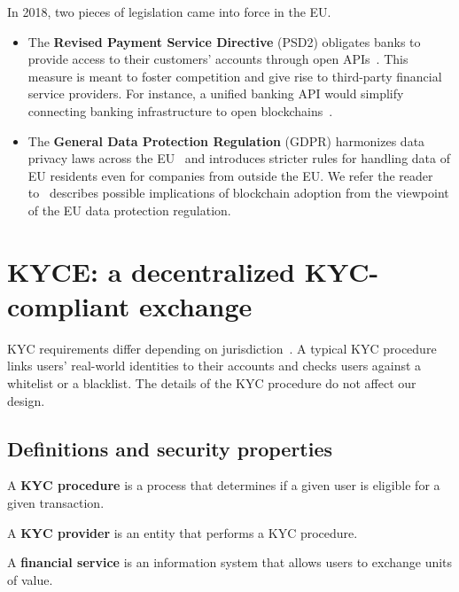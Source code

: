 In 2018, two pieces of legislation came into force in the EU\@.

\begin{itemize}
	\item The \textbf{Revised Payment Service Directive} (PSD2) obligates banks to provide access to their customers' accounts through open APIs~\cite{Hellstroem2017}.
	This measure is meant to foster competition and give rise to third-party financial service providers.
	For instance, a unified banking API would simplify connecting banking infrastructure to open blockchains~\cite{Elison2016}.
	\item The \textbf{General Data Protection Regulation} (GDPR) harmonizes data privacy laws across the EU~\cite{GDPR16} and introduces stricter rules for handling data of EU residents even for companies from outside the EU\@. We refer the reader to~\cite{Berberich2016} describes possible implications of blockchain adoption from the viewpoint of the EU data protection regulation.
\end{itemize}


\section{KYCE: a decentralized KYC-compliant exchange}

KYC requirements differ depending on jurisdiction~\cite{PWC2015}.
A typical KYC procedure links users' real-world identities to their accounts and checks users against a whitelist or a blacklist.
The details of the KYC procedure do not affect our design.

\subsection{Definitions and security properties}

\begin{definition}
	A \textbf{KYC procedure} is a process that determines if a given user is eligible for a given transaction.
\end{definition}

\begin{definition}
	A \textbf{KYC provider} is an entity that performs a KYC procedure.
\end{definition}

\begin{definition}
	A \textbf{financial service} is an information system that allows users to exchange units of value.
\end{definition}

